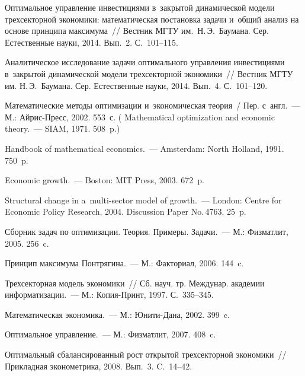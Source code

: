 \begin{multicols}{2}
{{\begin{thebibliography}{99}
Оптимальное управление инвестициями в~закрытой динамической модели трехсекторной 
экономики: математическая постановка задачи и~общий анализ на основе принципа максимума~// 
Вестник МГТУ им.\ Н.\,Э.~Баумана. Сер. Естественные науки,  2014. Вып.~2.  С.~101--115.

Аналитическое исследование задачи оптимального управления инвестициями в~закрытой 
динамической модели трехсекторной экономики~// Вестник МГТУ им. Н.\,Э.~Баумана. 
Сер. Естественные науки, 2014. Вып.~4. С.~101--120.

 Математические методы оптимизации и~экономическая теория~/ 
Пер. с~англ.~---  М.: Айрис-Пресс, 2002.  553~с.
(  Mathematical optimization and economic theory.~--- 
SIAM, 1971. 508~p.)

Handbook of mathematical economics.~---  Amsterdam: North Holland, 1991. 750~p.

 Economic growth.~--- Boston: MIT Press, 2003. 672~p.

 Structural change in a~multi-sector model of 
growth.~--- London: Centre 
for Economic Policy Research, 2004.  Discussion Paper No.\,4763. 25~p.



Сборник задач по оптимизации. Теория. Примеры. Задачи.~--- М.: Физматлит, 2005. 256~c.

Принцип максимума Понтрягина.~--- М.: Факториал, 2006. 144~c.

  Трехсекторная модель экономики~// Сб. науч. тр. Междунар. 
академии информатизации.~--- М.: Копия-Принт, 1997. С.~335--345.

\columnbreak


  Математическая  экономика.~--- М.: Юни\-ти-Да\-на, 2002. 399~c.


Оптимальное управление.~--- М.: Физматлит, 2007. 408~c.


Оптимальный сбалансированный рост открытой трехсекторной экономики~// 
Прикладная эконометрика, 2008. Вып.~3. C.~14--42.
\end{thebibliography}

 }
 }

\end{multicols}

